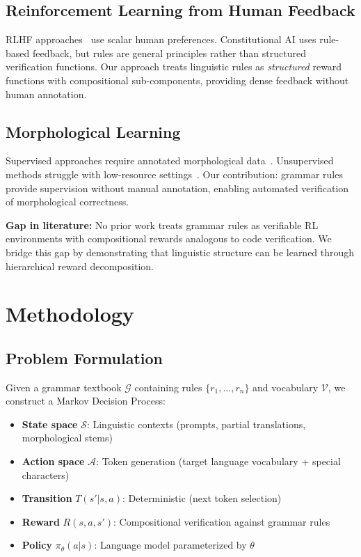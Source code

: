 \documentclass{article}
\begin{document}
\subsection{Reinforcement Learning from Human Feedback}

RLHF approaches~\cite{bai2022constitutional,ouyang2022training} use scalar human preferences. Constitutional AI uses rule-based feedback, but rules are general principles rather than structured verification functions. Our approach treats linguistic rules as \emph{structured} reward functions with compositional sub-components, providing dense feedback without human annotation.

\subsection{Morphological Learning}

Supervised approaches require annotated morphological data~\cite{makarov2018neural}. Unsupervised methods struggle with low-resource settings~\cite{hammarstrom2011unsupervised}. Our contribution: grammar rules provide supervision without manual annotation, enabling automated verification of morphological correctness.

\textbf{Gap in literature:} No prior work treats grammar rules as verifiable RL environments with compositional rewards analogous to code verification. We bridge this gap by demonstrating that linguistic structure can be learned through hierarchical reward decomposition.

\section{Methodology}

\subsection{Problem Formulation}

Given a grammar textbook $\mathcal{G}$ containing rules $\{r_1, \ldots, r_n\}$ and vocabulary $\mathcal{V}$, we construct a Markov Decision Process:

\begin{itemize}
    \item \textbf{State space} $\mathcal{S}$: Linguistic contexts (prompts, partial translations, morphological stems)
    \item \textbf{Action space} $\mathcal{A}$: Token generation (target language vocabulary + special characters)
    \item \textbf{Transition} $T(s'|s,a)$: Deterministic (next token selection)
    \item \textbf{Reward} $R(s,a,s')$: Compositional verification against grammar rules
    \item \textbf{Policy} $\pi_\theta(a|s)$: Language model parameterized by $\theta$
\end{itemize}
\end{document}
